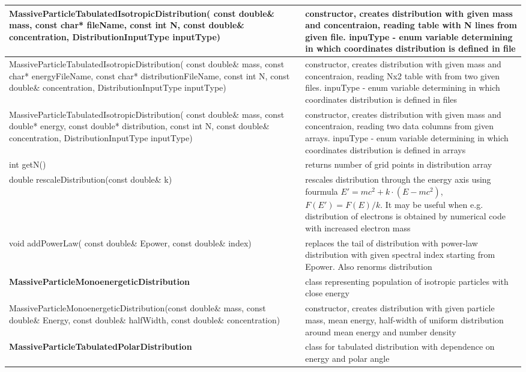 \begin{small}
\begin{xtabular}{|p{0.57\textwidth}|p{0.43\textwidth}|}
		\hline
		MassiveParticleTabulatedIsotropicDistribution( const double\& mass, const char* fileName, const int N, const double\& concentration, DistributionInputType inputType) & constructor, creates distribution with given mass and concentraion, reading table with N lines from given file. inpuType - enum variable determining in which coordinates distribution is defined in file\\
		\hline
		MassiveParticleTabulatedIsotropicDistribution( const double\& mass, const char* energyFileName, const char* distributionFileName, const int N, const double\& concentration, DistributionInputType inputType) & constructor, creates distribution with given mass and concentraion, reading Nx2 table with from two given files. inpuType - enum variable determining in which coordinates distribution is defined in files\\
		\hline
		MassiveParticleTabulatedIsotropicDistribution( const double\& mass, const double* energy, const double* distribution, const int N, const double\& concentration, DistributionInputType inputType) & constructor, creates distribution with given mass and concentraion, reading two data columns from given arrays. inpuType - enum variable determining in which coordinates distribution is defined in arrays\\
		\hline
		int getN() & returns number of grid points in distribution array\\
		\hline
		double rescaleDistribution(const double\& k) & rescales distribution through the energy axis using fourmula $E' = mc^2 + k\cdot(E-mc^2)$, $F(E')=F(E)/k$. It may be useful when e.g. distribution of electrons is obtained by numerical code with increased electron mass\\
		\hline
		void addPowerLaw( const double\& Epower, const double\& index) & replaces the tail of distribution with power-law distribution with given spectral index starting from Epower. Also renorms distribution\\
		\hline
		\textbf{MassiveParticleMonoenergeticDistribution} & class representing population of isotropic particles with close energy\\
		\hline
		MassiveParticleMonoenergeticDistribution(const double\& mass, const double\& Energy, const double\& halfWidth, const double\& concentration) & constructor, creates distribution with given particle mass, mean energy, half-width of uniform distribution around mean energy and number density\\
		\hline 
		\textbf{MassiveParticleTabulatedPolarDistribution} & class for tabulated distribution with dependence on energy and polar angle\\

\end{xtabular}
\end{small}
